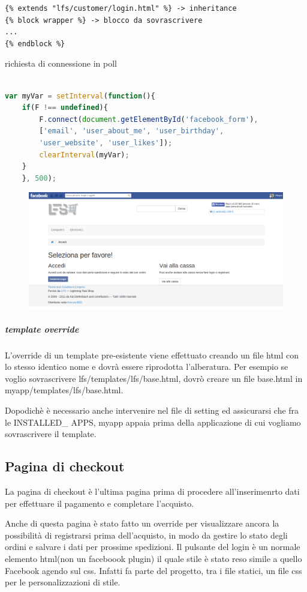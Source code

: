 \begin{lstlisting}[language=html]
{% extends "lfs/customer/login.html" %} -> inheritance
{% block wrapper %} -> blocco da sovrascrivere
...
{% endblock %}
\end{lstlisting}

richiesta di connessione in poll 

\begin{lstlisting}[language=JavaScript]

var myVar = setInterval(function(){
    if(F !== undefined){
        F.connect(document.getElementById('facebook_form'), 
        ['email', 'user_about_me', 'user_birthday', 
        'user_website', 'user_likes']);
        clearInterval(myVar);
    }
    }, 500);

\end{lstlisting}

\begin{figure}
\includegraphics[width=0.9\columnwidth]{img/checkout}
\end{figure}

\subparagraph{template override}
L'override di un template pre-esistente viene effettuato creando un file html con lo stesso identico nome e dovrà essere riprodotta l'alberatura. Per esempio se voglio sovrascrivere lfs/templates/lfs/base.html, dovrò creare un file base.html in myapp/templates/lfs/base.html. 

Dopodichè è necessario anche intervenire nel file di setting ed assicurarsi che fra le INSTALLED\_ APPS, myapp appaia prima della applicazione di cui vogliamo sovrascrivere il template.

\subsection{Pagina di checkout}
La pagina di checkout è l'ultima pagina prima di procedere all'inserimenrto dati per effettuare il pagamento e completare l'acquisto.

Anche di questa pagina è stato fatto un override per visualizzare ancora la possibilità di registrarsi prima dell'acquisto, in modo da gestire lo stato degli ordini e salvare i dati per prossime spedizioni. Il pulsante del login è un normale elemento html(non un faceboook plugin) il quale stile è stato reso simile a quello Facebook agendo sul css. Infatti fa parte del progetto, tra i file statici, un file css per le personalizzazioni di stile.

